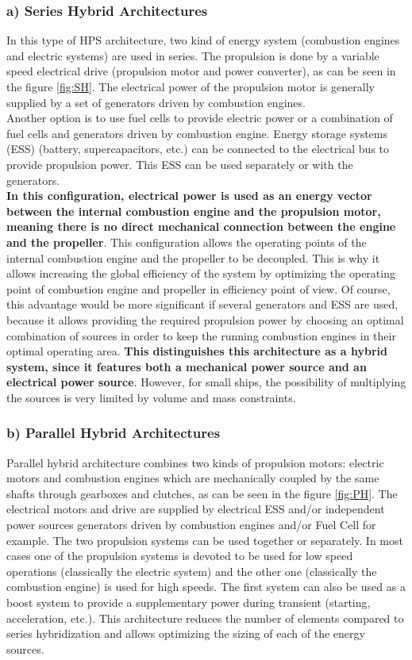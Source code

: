\subsubsection{a) Series Hybrid Architectures}


In this type of HPS architecture, two kind of energy system (combustion engines and electric systems) are used in series. The propulsion is done by a variable speed electrical drive (propulsion motor and power converter), as can be seen in the figure \ref{fig:SH}. The electrical power of the propulsion motor is generally supplied by a set of generators driven by combustion engines. \\ Another option is to use fuel cells to provide electric power or a combination of fuel cells and generators driven by combustion engine. Energy storage systems (ESS) (battery, supercapacitors, etc.) can be connected to the electrical bus to provide propulsion power. This ESS can be used separately or with the generators. \\
\textbf{In this configuration, electrical power is used as an energy vector between the internal combustion engine and the propulsion motor, meaning there is no direct mechanical connection between the engine and the propeller}. This configuration allows the operating points of the internal combustion engine and the propeller to be decoupled. This is why it allows increasing the global efficiency of the system by optimizing the operating point of combustion engine and propeller in efficiency point of view. Of course, this advantage would be more significant if several generators and ESS are used, because it allows providing the required propulsion power by choosing an optimal combination of sources in order to keep the running combustion engines in their optimal operating area. 
\textbf{This distinguishes this architecture as a hybrid system, since it features both a mechanical power source and an electrical power source}.
However, for small ships, the possibility of multiplying the sources is very limited by volume and mass constraints.

\subsubsection{b) Parallel Hybrid Architectures}


Parallel hybrid architecture combines two kinds of propulsion motors: electric motors and combustion engines which are mechanically coupled by the same shafts through gearboxes and clutches, as can be seen in the figure \ref{fig:PH}. The electrical motors and drive are supplied by electrical ESS and/or independent power sources generators driven by combustion engines and/or Fuel Cell for example. The two propulsion systems can be used together or separately. In most cases one of the propulsion systems is devoted to be used for low speed operations (classically the electric system) and the other one (classically the combustion engine) is used for high speeds. The first system can also be used as a boost system to provide a supplementary power during transient (starting, acceleration, etc.). This architecture reduces the number of elements compared to series hybridization  and allows optimizing the sizing of each of the energy sources.


